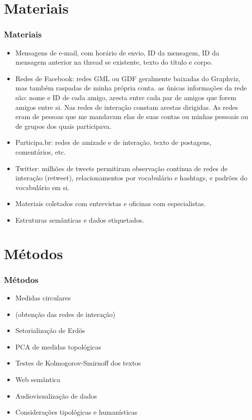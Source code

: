 \documentclass[10pt]{beamer}
\begin{document}
\section{Materiais}
\begin{frame}
\frametitle{Materiais}
\begin{itemize}
	\item Mensagens de e-mail, com horário de envio, ID da mensagem, ID da mensagem anterior na thread se existente, texto do título e corpo. 
	\item Redes de Facebook: redes GML ou GDF geralmente baixadas do Graphviz, mas também raspadas de minha própria conta. as únicas informações da rede são: nome e ID de cada amigo, aresta entre cada par de amigos que forem amigos entre si. Nas redes de interação constam arestas dirigidas. As redes eram de pessoas que me mandavam elas de suas contas ou minhas pessoais ou de grupos dos quais participava.
	\item Participa.br: redes de amizade e de interação, texto de postagens, comentários, etc.
	\item Twitter: milhões de tweets permitiram observação contínua de redes de interação (retweet), relacionamentos por vocabulário e hashtags, e padrões do vocabulário em si.
	\item Materiais coletados com entrevistas e oficinas com especialistas.
	\item Estruturas semânticas e dados etiquetados.
\end{itemize}
\end{frame}



\section{Métodos}
\begin{frame}
\frametitle{Métodos}
\begin{itemize}
	\item Medidas circulares
	\item (obtenção das redes de interação)
	\item Setorialização de Erdös
	\item PCA de medidas topológicas
	\item Testes de Kolmogorov-Smirnoff dos textos
	\item Web semântica
	\item Audiovisualização de dados
	\item Considerações tipológicas e humanísticas
\end{itemize}
\end{frame}
\end{document}

